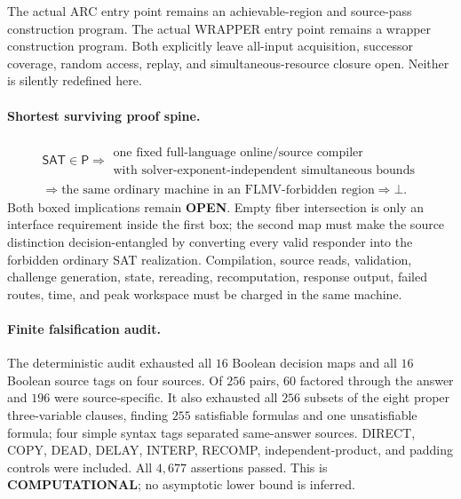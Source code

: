 \documentclass[11pt]{article}
\newcommand{\statusopen}{\textcolor{openstatus}{\textbf{OPEN}}}
\begin{document}
The actual ARC entry point  remains an achievable-region and
source-pass construction program.  The actual WRAPPER entry point
 remains a wrapper construction program.  Both explicitly
leave all-input acquisition, successor coverage, random access, replay, and
simultaneous-resource closure open.  Neither is silently redefined here.

\paragraph{Shortest surviving proof spine.}
\[
\begin{gathered}
\mathsf{SAT}\in\mathsf P
\Longrightarrow
\boxed{\begin{array}{c}
\text{one fixed full-language online/source compiler}\\
\text{with solver-exponent-independent simultaneous bounds}
\end{array}}\\
\Longrightarrow
\boxed{\text{the same ordinary machine in an FLMV-forbidden region}}
\Longrightarrow\bot .
\end{gathered}
\]
Both boxed implications remain \statusopen.  Empty fiber intersection is only
an interface requirement inside the first box; the second map must make the
source distinction decision-entangled by converting every valid responder
into the forbidden ordinary SAT realization.  Compilation, source reads,
validation, challenge generation, state, rereading, recomputation, response
output, failed routes, time, and peak workspace must be charged in the same
machine.

\paragraph{Finite falsification audit.}
The deterministic audit exhausted all $16$ Boolean decision maps and all
$16$ Boolean source tags on four sources.  Of $256$ pairs, $60$ factored
through the answer and $196$ were source-specific.  It also exhausted all
$256$ subsets of the eight proper three-variable clauses, finding $255$
satisfiable formulas and one unsatisfiable formula; four simple syntax tags
separated same-answer sources.  DIRECT, COPY, DEAD, DELAY, INTERP, RECOMP,
independent-product, and padding controls were included.  All $4{,}677$
assertions passed.  This is \textbf{COMPUTATIONAL}; no asymptotic lower bound
is inferred.
\end{document}
